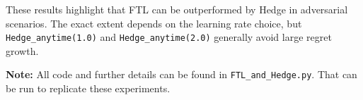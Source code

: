 These results highlight that FTL can be outperformed by Hedge in adversarial scenarios.  The exact extent depends on the learning rate choice, but \texttt{Hedge\_anytime(1.0)} and \texttt{Hedge\_anytime(2.0)} generally avoid large regret growth.

\bigskip
\noindent
\textbf{Note:} All code and further details can be found in \texttt{FTL\_and\_Hedge.py}. That can be run to replicate these experiments.
